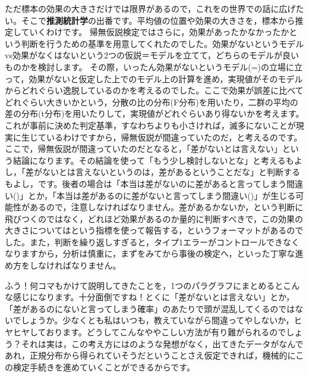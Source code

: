\documentclass{ltjbook}
\begin{document}
ただ標本の効果の大きさだけでは限界があるので，これをの世界での話に広げたい。そこで\textbf{推測統計学}の出番です。平均値の位置や効果の大きさを，標本から推定していくわけです。
帰無仮説検定ではさらに，効果があったかなかったかという判断を行うための基準を用意してくれたのでした。効果がないというモデルvs効果がなくはないという2つの仮説＝モデルを立てて，どちらのモデルが良いものかを検討します。
その際，いったん効果がないというモデル(=)の立場に立って，効果がないと仮定した上でのモデル上の計算を進め，実現値がそのモデルからどれぐらい逸脱しているのかを考えるのでした。ここで効果が誤差に比べてどれぐらい大きいかという，分散の比の分布(F分布)を用いたり，二群の平均の差の分布(t分布)を用いたりして，実現値がどれぐらいあり得ないかを考えます。これが事前に決めた判定基準，すなわちよりも小さければ，滅多にないことが現実に生じているわけですから，帰無仮説が間違っていたのだ，と考えるのです。ここで，帰無仮説が間違っていたのだとなると，「差がないとは言えない」という結論になります。その結論を使って「もう少し検討しないとな」と考えるもよし，「差がないとは言えないというのは，差があるということだな」と判断するもよし，です。後者の場合は「本当は差がないのに差があると言ってしまう間違い()」とか，「本当は差があるのに差がないと言ってしまう間違い()」が生じる可能性があるので，注意しなければなりません。差があるかないか，という判断に飛びつくのではなく，どれほど効果があるのか量的に判断すべきで，この効果の大きさについてはという指標を使って報告する，というフォーマットがあるのでした。また，判断を繰り返しすぎると，タイプ1エラーがコントロールできなくなりますから，分析は慎重に，まずをみてから事後の検定へ，といった丁寧な進め方をしなければなりません。

ふう！何コマもかけて説明してきたことを，1つのパラグラフにまとめるとこんな感じになります。十分面倒ですね！とくに「差がないとは言えない」とか，「差があるのにないと言ってしまう確率」のあたりで頭が混乱してくるのではないでしょうか。少なくとも私はいつも，教えていながら間違ってやしないか，ヒヤヒヤしております。どうしてこんなややこしい方法が有り難がられるのでしょう？それは実は，この考え方にはのような発想がなく，出てきたデータがなんであれ，正規分布から得られていそうだということさえ仮定できれば，機械的にこの検定手続きを進めていくことができるからです。
\end{document}
